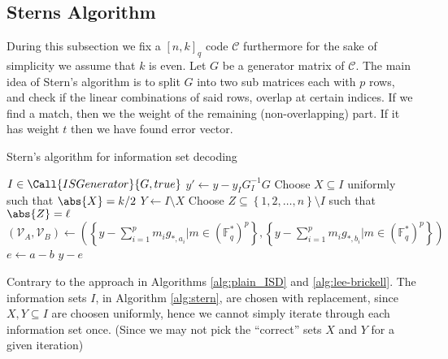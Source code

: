\subsection{Sterns Algorithm}
During this subsection we fix a $[n, k]_q$ code $\mathcal{C}$ furthermore for the sake of simplicity we assume that $k$ is even. Let $G$ be a generator matrix of $\mathcal{C}$. The main idea of Stern's algorithm is to split $G$ into two sub matrices each with $p$ rows, and check if the linear combinations of said rows, overlap at certain indices. If we find a match, then we the weight of the remaining (non-overlapping) part. If it has weight $t$ then we have found error vector.
\begin{algorithm}[H]
\caption{Stern's algorithm for information set decoding}\label{alg:stern}
\begin{algorithmic}
  \Loop
  \State $I \in \Call{IS Generator}{G, true}$ 
  \State $y' \gets y - y_I G_I^{-1}G$
  \State Choose $X \subseteq I$ uniformly such that $\abs{X} = k / 2$
  \State $Y \gets I \setminus X$
  \State Choose $Z \subseteq \left\{1, 2, \ldots, n\right\} \setminus I$ such that $\abs{Z} = \ell$
  \State $(\mathcal{V}_A, \mathcal{V}_{B}) \gets \left(\left\{y - \sum_{i = 1}^p m_i g_{*, a_i} | m \in (\mathbb{F}_q^{*})^p\right\}, \left\{y - \sum_{i = 1}^p m_i g_{*, b_i} | m \in (\mathbb{F}_q^{*})^p\right\}\right)$
    \State $e \gets a - b$
    \State \Return $y - e$
    \EndIf
    \EndFor
  \EndFor
  \EndLoop
  \EndProcedure
\end{algorithmic}
\end{algorithm}
\begin{remark}
  Contrary to the approach in Algorithms \ref{alg:plain_ISD} and \ref{alg:lee-brickell}. The information sets $I$, in Algorithm \ref{alg:stern}, are chosen with replacement, since $X, Y \subseteq I$ are choosen uniformly, hence we cannot simply iterate through each information set once. (Since we may not pick the ``correct'' sets $X$ and $Y$ for a given iteration)
\end{remark}

